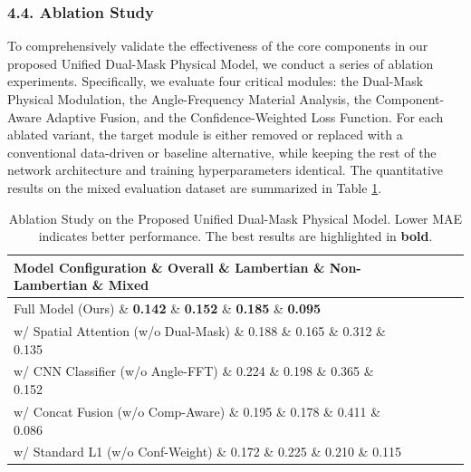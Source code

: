 \subsubsection{4.4. Ablation Study}

To comprehensively validate the effectiveness of the core components in our proposed Unified Dual-Mask Physical Model, we conduct a series of ablation experiments. Specifically, we evaluate four critical modules: the Dual-Mask Physical Modulation, the Angle-Frequency Material Analysis, the Component-Aware Adaptive Fusion, and the Confidence-Weighted Loss Function. For each ablated variant, the target module is either removed or replaced with a conventional data-driven or baseline alternative, while keeping the rest of the network architecture and training hyperparameters identical. The quantitative results on the mixed evaluation dataset are summarized in Table \ref{tab:ablation}.

\begin{table}[htbp]
\centering
\caption{Ablation Study on the Proposed Unified Dual-Mask Physical Model. Lower MAE indicates better performance. The best results are highlighted in \textbf{bold}.}
\label{tab:ablation}
\renewcommand{\arraystretch}{1.25}
\begin{tabular}{lcccc}
\toprule
\textbf{Model Configuration} \& \textbf{Overall} \& \textbf{Lambertian} \& \textbf{Non-Lambertian} \& \textbf{Mixed} \\
\midrule
Full Model (Ours) \& \textbf{0.142} \& \textbf{0.152} \& \textbf{0.185} \& \textbf{0.095} \\
w/ Spatial Attention (w/o Dual-Mask) \& 0.188 \& 0.165 \& 0.312 \& 0.135 \\
w/ CNN Classifier (w/o Angle-FFT) \& 0.224 \& 0.198 \& 0.365 \& 0.152 \\
w/ Concat Fusion (w/o Comp-Aware) \& 0.195 \& 0.178 \& 0.411 \& 0.086 \\
w/ Standard L1 (w/o Conf-Weight) \& 0.172 \& 0.225 \& 0.210 \& 0.115 \\
\bottomrule
\end{tabular}
\end{table}

